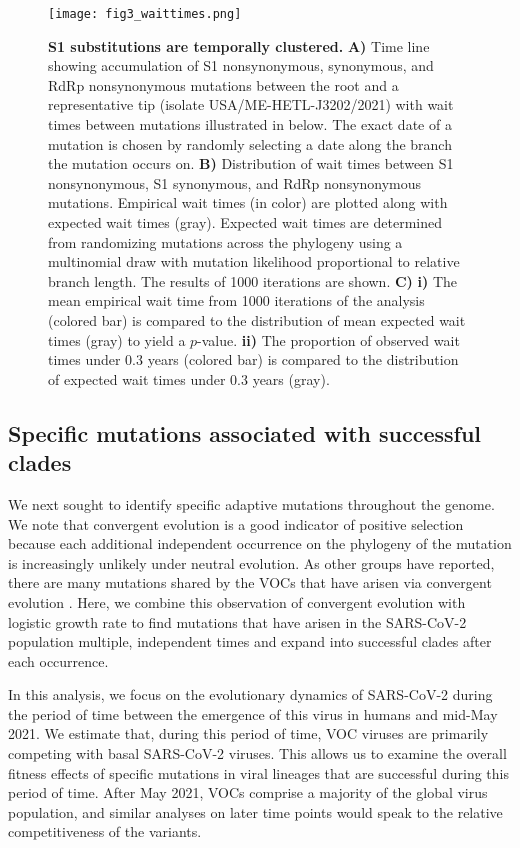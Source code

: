 \documentclass[11pt,oneside,letterpaper]{article}
\begin{document}
\begin{figure}[h!]
	\centerline{\texttt{[image: fig3\_waittimes.png]}}
	\caption{\textbf{S1 substitutions are temporally clustered.}
	\textbf{A)} Time line showing accumulation of S1 nonsynonymous, synonymous, and RdRp nonsynonymous mutations between the root and a representative tip (isolate USA/ME-HETL-J3202/2021) with wait times between mutations illustrated in below.
	The exact date of a mutation is chosen by randomly selecting a date along the branch the mutation occurs on.
	\textbf{B)} Distribution of wait times between S1 nonsynonymous, S1 synonymous, and RdRp nonsynonymous mutations.
	Empirical wait times (in color) are plotted along with expected wait times (gray).
	Expected wait times are determined from randomizing mutations across the phylogeny using a multinomial draw with mutation likelihood proportional to relative branch length.
	The results of 1000 iterations are shown.
	\textbf{C)} \textbf{i)} The mean empirical wait time from 1000 iterations of the analysis (colored bar) is compared to the distribution of mean expected wait times (gray) to yield a $p$-value.
	\textbf{ii)} The proportion of observed wait times under 0.3 years (colored bar) is compared to the distribution of expected wait times under 0.3 years (gray).
	}
	\label{fig:waittimes}
\end{figure}

\subsection*{Specific mutations associated with successful clades}
We next sought to identify specific adaptive mutations throughout the genome.
We note that convergent evolution is a good indicator of positive selection because each additional independent occurrence on the phylogeny of the mutation is increasingly unlikely under neutral evolution.
As other groups have reported, there are many mutations shared by the VOCs that have arisen via convergent evolution \cite{Van_Dorp2020-ox, Rochman2021-sv, Martin2021-lj}.
Here, we combine this observation of convergent evolution with logistic growth rate to find mutations that have arisen in the SARS-CoV-2 population multiple, independent times and expand into successful clades after each occurrence.

In this analysis, we focus on the evolutionary dynamics of SARS-CoV-2 during the period of time between the emergence of this virus in humans and mid-May 2021.
We estimate that, during this period of time, VOC viruses are primarily competing with basal SARS-CoV-2 viruses.
This allows us to examine the overall fitness effects of specific mutations in viral lineages that are successful during this period of time.
After May 2021, VOCs comprise a majority of the global virus population, and similar analyses on later time points would speak to the relative competitiveness of the variants.
\end{document}
